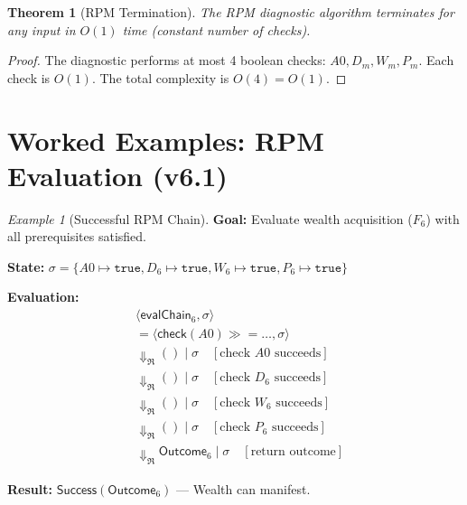 \documentclass[11pt,twoside,openright]{book}
\theoremstyle{definition}
\theoremstyle{plain}
\newtheorem{theorem}[definition]{Theorem}
\theoremstyle{remark}
\newtheorem{example}[definition]{Example}
\newcommand{\RPM}{\mathfrak{R}}
\newcommand{\rpmbind}{\mathbin{\gg\!=}}
\newcommand{\bigstep}{\Downarrow}
\begin{document}
\begin{theorem}[RPM Termination]
\label{thm:rpm-term}
The RPM diagnostic algorithm terminates for any input in $O(1)$ time (constant number of checks).
\end{theorem}

\begin{proof}
The diagnostic performs at most 4 boolean checks: $A0, D_m, W_m, P_m$. Each check is $O(1)$. The total complexity is $O(4) = O(1)$.
\end{proof}

\section{Worked Examples: RPM Evaluation (v6.1)}

\begin{example}[Successful RPM Chain]
\label{ex:rpm-success}
\textbf{Goal:} Evaluate wealth acquisition ($F_6$) with all prerequisites satisfied.

\textbf{State:} $\sigma = \{A0 \mapsto \mathtt{true}, D_6 \mapsto \mathtt{true}, W_6 \mapsto \mathtt{true}, P_6 \mapsto \mathtt{true}\}$

\textbf{Evaluation:}
\begin{align}
&\langle \mathsf{evalChain}_6, \sigma \rangle \\
&= \langle \mathsf{check}(A0) \rpmbind \ldots, \sigma \rangle \\
&\bigstep_\RPM () \mid \sigma \quad [\text{check } A0 \text{ succeeds}] \\
&\bigstep_\RPM () \mid \sigma \quad [\text{check } D_6 \text{ succeeds}] \\
&\bigstep_\RPM () \mid \sigma \quad [\text{check } W_6 \text{ succeeds}] \\
&\bigstep_\RPM () \mid \sigma \quad [\text{check } P_6 \text{ succeeds}] \\
&\bigstep_\RPM \mathsf{Outcome}_6 \mid \sigma \quad [\text{return outcome}]
\end{align}

\textbf{Result:} $\mathsf{Success}(\mathsf{Outcome}_6)$ --- Wealth can manifest.
\end{example}
\end{document}
